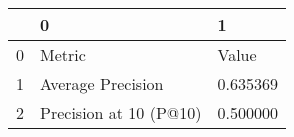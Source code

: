 \begin{tabular}{lll}
\toprule
 & 0 & 1 \\
\midrule
0 & Metric & Value \\
1 & Average Precision & 0.635369 \\
2 & Precision at 10 (P@10) & 0.500000 \\
\bottomrule
\end{tabular}
